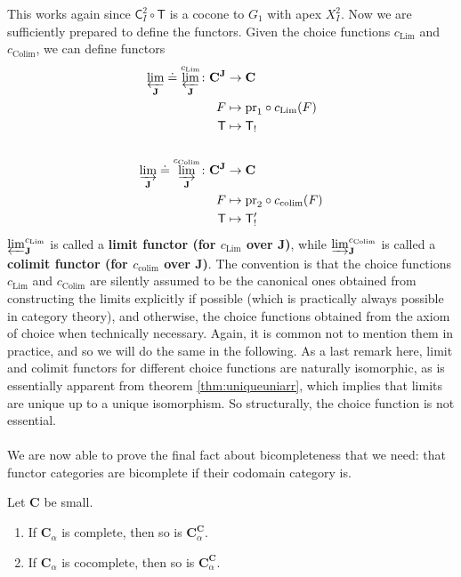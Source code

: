 This works again since $\mathsf{C}_{I}^{2} \circ \mathsf{T}$ is a cocone to $G_{1}$ with apex $X_{I}^{2}$.
Now we are sufficiently prepared to define the functors.
Given the choice functions $c_{\mathrm{Lim}}$ and $c_{\mathrm{Colim}}$, we can define functors
\begin{align*}
  \varprojlim_{\mathbf{J}}
  \doteq
  \varprojlim_{\mathbf{J}}^{c_{\mathrm{Lim}}}
  \colon
  \mathbf{C}^{\mathbf{J}}
  &\rightarrow
  \mathbf{C}
  \\
  F
  &\mapsto
  \mathrm{pr}_{1}
  \circ
  c_{\mathrm{Lim}}(F)
  \\
  \mathsf{T}
  &\mapsto
  \mathsf{T}_{!}
  \\
  \\
  \varinjlim_{\mathbf{J}}
  \doteq
  \varinjlim_{\mathbf{J}}^{c_{\mathrm{Colim}}}
  \colon
  \mathbf{C}^{\mathbf{J}}
  &\rightarrow
  \mathbf{C}
  \\
  F
  &\mapsto
  \mathrm{pr}_{2}
  \circ
  c_{\mathrm{colim}}(F)
  \\
  \mathsf{T}
  &\mapsto
  \mathsf{T}_{!}^{\prime}
\end{align*}
$\varprojlim_{\mathbf{J}}^{c_{\mathrm{Lim}}}$ is called a \textbf{limit functor (for $c_{\mathrm{Lim}}$ over $\mathbf{J}$)}, while $\varinjlim_{\mathbf{J}}^{c_{\mathrm{Colim}}}$ is called a \textbf{colimit functor (for $c_{\mathrm{colim}}$ over $\mathbf{J}$)}.
The convention is that the choice functions $c_{\mathrm{Lim}}$ and $c_{\mathrm{Colim}}$ are silently assumed to be the canonical ones obtained from constructing the limits explicitly if possible (which is practically always possible in category theory), and otherwise, the choice functions obtained from the axiom of choice when technically necessary.
Again, it is common not to mention them in practice, and so we will do the same in the following.
As a last remark here, limit and colimit functors for different choice functions are naturally isomorphic, as is essentially apparent from theorem \ref{thm:uniqueuniarr}, which implies that limits are unique up to a unique isomorphism.
So structurally, the choice function is not essential.
\\\\
We are now able to prove the final fact about bicompleteness that we need: that functor categories are bicomplete if their codomain category is.
\\
\begin{thm}
\label{thm:funccatbicomplete}
Let $\mathbf{C}$ be small.
\begin{enumerate}
\item[(1T)]
If $\mathbf{C}_{\alpha}$ is complete, then so is $\mathbf{C}_{\alpha}^{\mathbf{C}}$.
\item[(1I)]
If $\mathbf{C}_{\alpha}$ is cocomplete, then so is $\mathbf{C}_{\alpha}^{\mathbf{C}}$.
\end{enumerate}
\end{thm}
